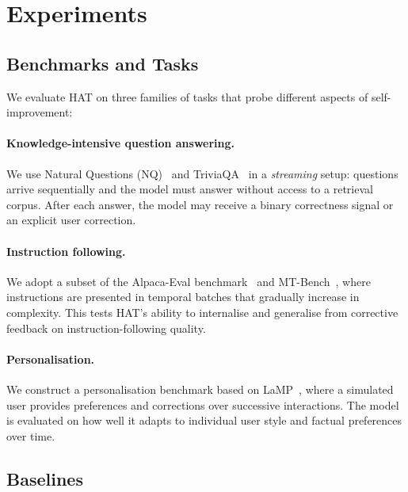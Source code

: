 \section{Experiments}
\label{sec:experiments}

\subsection{Benchmarks and Tasks}
\label{sec:experiments:benchmarks}

We evaluate HAT on three families of tasks that probe different aspects of self-improvement:

\paragraph{Knowledge-intensive question answering.}
We use Natural Questions (NQ)~\citep{kwiatkowski2019natural} and TriviaQA~\citep{joshi2017triviaqa} in a \emph{streaming} setup: questions arrive sequentially and the model must answer without access to a retrieval corpus.  After each answer, the model may receive a binary correctness signal or an explicit user correction.

\paragraph{Instruction following.}
We adopt a subset of the Alpaca-Eval benchmark~\citep{li2023alpacaeval} and MT-Bench~\citep{zheng2023judging}, where instructions are presented in temporal batches that gradually increase in complexity.  This tests HAT's ability to internalise and generalise from corrective feedback on instruction-following quality.

\paragraph{Personalisation.}
We construct a personalisation benchmark based on LaMP~\citep{salemi2024lamp}, where a simulated user provides preferences and corrections over successive interactions.  The model is evaluated on how well it adapts to individual user style and factual preferences over time.

\subsection{Baselines}
\label{sec:experiments:baselines}

